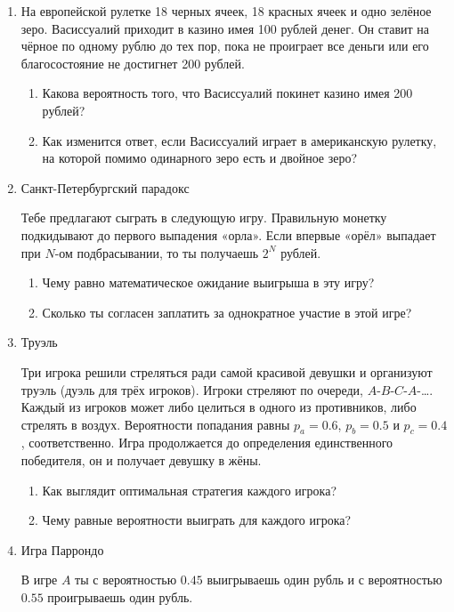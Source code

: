 \documentclass[nobib]{tufte-handout}
\begin{document}
\begin{enumerate}
\item На европейской рулетке 18 черных ячеек, 18 красных ячеек и одно зелёное зеро. Васиссуалий приходит в казино имея 100 рублей денег. Он ставит на чёрное по одному рублю до тех пор, пока не проиграет все деньги или его благосостояние не достигнет 200 рублей.

\begin{enumerate}
\item Какова вероятность того, что Васиссуалий покинет казино имея 200 рублей?
\item Как изменится ответ, если Васиссуалий играет в американскую рулетку, на которой помимо одинарного зеро есть и двойное зеро?
\end{enumerate}

\item Санкт-Петербургский парадокс

Тебе предлагают сыграть в следующую игру. Правильную монетку подкидывают до первого выпадения «орла». Если впервые «орёл» выпадает при $N$-ом подбрасывании, то ты получаешь $2^N$ рублей.

\begin{enumerate}
\item Чему равно математическое ожидание выигрыша в эту игру?
\item Сколько ты согласен заплатить за однократное участие в этой игре?
\end{enumerate}


\item Труэль

Три игрока решили стреляться ради самой красивой девушки и организуют труэль (дуэль для трёх игроков).  Игроки стреляют по очереди, $A$-$B$-$C$-$A$-\ldots. Каждый из игроков может либо целиться в одного из противников, либо стрелять в воздух. Вероятности попадания равны $p_a=0.6$, $p_b=0.5$ и $p_c=0.4$, соответственно. Игра продолжается до определения единственного победителя, он и получает девушку в жёны. 

\begin{enumerate}
\item Как выглядит оптимальная стратегия каждого игрока?
\item Чему равные вероятности выиграть для каждого игрока?
\end{enumerate}



\item Игра Паррондо

В игре $A$ ты с вероятностью $0.45$ выигрываешь один рубль и с вероятностью $0.55$ проигрываешь один рубль. 


\end{enumerate}
\end{document}
